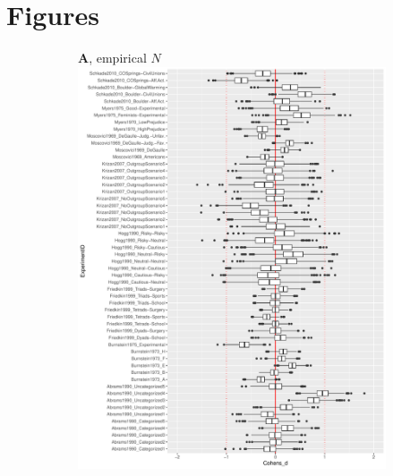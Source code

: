 \documentclass[11pt, letterpaper]{article}
\begin{document}


\setlength{\bibleftmargin}{.125in}
\setlength{\bibindent}{-\bibleftmargin}



\appendix

\section*{Figures}

\begin{figure}
  \caption{
    Boxplots visualizing the distribution of Cohen's $d$ values (x-axis in
    A and B) inferred through a metric linear model over 1000 simulation 
    trials for each experimental condition (y-axis in A and B). All conditions
    have many trials that result in non-zero Cohen's $d$ values with number of
    simulated participants, $N$, set to their empirical values reported in the
    associated journal article (A). However, when the number of simulated
    participants is increased to $10N$, there are several conditions that 
    indeed yield distributions closer to $d = 0$ as expected, however some
    conditions have $d$ distributions centered on a nonzero mean with little to
    no overlap with $d=0$; variance in $d$ decreases as expected
    across experimental conditions (B).
  }  
  \label{fig:MetricBoxplot}
  \centering
  \begin{subfigure}[]{0.9\textwidth}
    \centering
    \textsf{\large \textbf{A}, empirical $N$} \\
    \includegraphics[width=\textwidth]{Figures/boxplots/metric_cohens.pdf}

\end{subfigure}
\end{figure}
\end{document}
